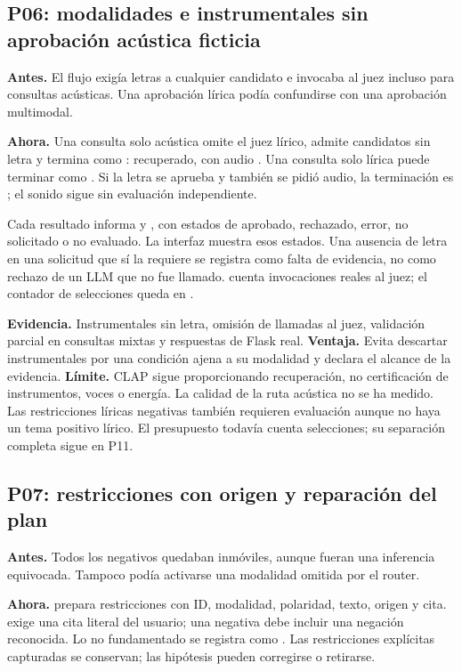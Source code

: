 \subsection{P06: modalidades e instrumentales sin aprobación acústica ficticia}
\textbf{Antes.} El flujo exigía letras a cualquier candidato e invocaba al juez
incluso para consultas acústicas. Una aprobación lírica podía confundirse con
una aprobación multimodal.

\textbf{Ahora.} Una consulta solo acústica omite el juez lírico, admite candidatos
sin letra y termina como : recuperado, con audio
. Una consulta solo lírica puede terminar como
. Si la letra se aprueba y también se pidió audio, la terminación
es ; el sonido sigue sin evaluación independiente.

Cada resultado informa  y , con
estados de aprobado, rechazado, error, no solicitado o no evaluado. La interfaz
muestra esos estados. Una ausencia de letra en una solicitud que sí la requiere
se registra como falta de evidencia, no como rechazo de un LLM que no fue llamado.
 cuenta invocaciones reales al juez; el contador de
selecciones queda en .

\textbf{Evidencia.} Instrumentales sin letra, omisión de llamadas al juez,
validación parcial en consultas mixtas y respuestas de Flask real.
\textbf{Ventaja.} Evita descartar instrumentales por una condición ajena a su
modalidad y declara el alcance de la evidencia.
\textbf{Límite.} CLAP sigue proporcionando recuperación, no certificación de
instrumentos, voces o energía. La calidad de la ruta acústica no se ha medido.
Las restricciones líricas negativas también requieren evaluación aunque no haya un tema positivo lírico. El presupuesto todavía cuenta selecciones; su separación completa sigue en P11.

\subsection{P07: restricciones con origen y reparación del plan}
\textbf{Antes.} Todos los negativos quedaban inmóviles, aunque fueran una
inferencia equivocada. Tampoco podía activarse una modalidad omitida por el router.

\textbf{Ahora.}  prepara restricciones con ID, modalidad,
polaridad, texto, origen y cita.  exige una cita literal del
usuario; una negativa debe incluir una negación reconocida. Lo no fundamentado
se registra como . Las restricciones explícitas capturadas
se conservan; las hipótesis pueden corregirse o retirarse.

